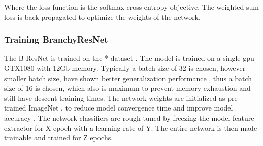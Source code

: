 Where the loss function is the softmax cross-entropy objective.
The weighted sum loss is back-propagated to optimize the weights of the network. 

\subsubsection{Training BranchyResNet}

The B-ResNet is trained on the *-dataset \cite{dataset}. The model is trained on a single \gls{gpu} GTX1080 with 12Gb memory. Typically a batch size of 32 is chosen, however smaller batch size, have shown better generalization performance \cite{masters_revisiting_nodate}, thus a batch size of 16 is chosen, which also is maximum to prevent memory exhaustion and still have descent training times. The network weights are initialized as pre-trained ImageNet \cite{deng_imagenet:_2009}, to reduce model convergence time and improve model accuracy \cite{yosinski_how_2014}. The network classifiers are rough-tuned by freezing the model feature extractor for X epoch with a learning rate of Y. The entire network is then made trainable and trained for Z epochs.


